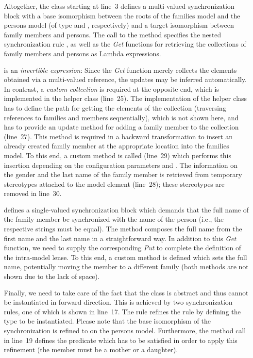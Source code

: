 Altogether, the class starting at line~3 defines a multi-valued synchronization block with a base isomorphism between the roots of the families model and the persons model (of type  and , respectively) and a target isomorphism between family members and persons. The call to the method  specifies the nested synchronization rule , as well as the \emph{Get} functions for retrieving the collections of family members and persons as Lambda expressions. 

 is an \emph{invertible expression}: Since the \emph{Get} function merely collects the elements obtained via a multi-valued reference, the updates may be inferred automatically. In contrast, a \emph{custom collection} is required at the opposite end, which is implemented in the helper class  (line~25). The implementation of the helper class has to define the path for getting the elements of the collection (traversing references to families and members sequentially), which is not shown here, and has to provide an update method for adding a family member to the collection (line~27). This  method is required in a backward transformation to insert an already created family member at the appropriate location into the families model. To this end, a custom method  is called (line~29) which performs this insertion depending on the configuration parameters  and . The information on the gender and the last name of the family member is retrieved from temporary stereotypes attached to the model element (line~28); these stereotypes are removed in line~30.

 defines a single-valued synchronization block which demands that the full name of the family member be synchronized with the name of the person (i.e., the respective strings must be equal). The method  composes the full name from the first name and the last name in a straightforward way. In addition to this \emph{Get} function, we need to supply the corresponding \emph{Put} to complete the definition of the intra-model lense. To this end, a custom method  is defined which sets the full name, potentially moving the member to a different family (both methods are not shown due to the lack of space).

Finally, we need to take care of the fact that the class  is abstract and thus cannot be instantiated in forward direction. This is achieved by two synchronization rules, one of which is shown in line~17. The rule  refines the rule  by defining the type to be instantiated. Please note that the base isomorphism of the synchronization is refined to  on the persons model. Furthermore, the method call in line~19 defines the predicate which has to be satisfied in order to apply this refinement (the member must be a mother or a daughter).  
